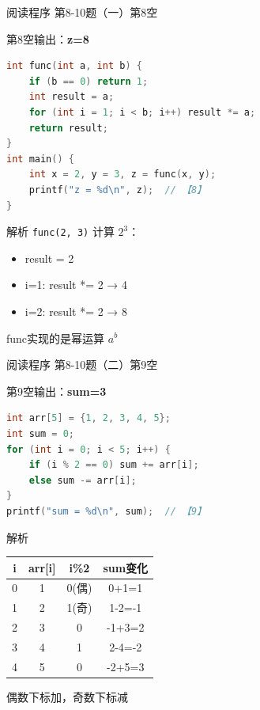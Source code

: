 \begin{frame}[fragile]{阅读程序 第8-10题（一）}{第8空}
    \begin{exampleblock}{第8空输出：\textbf{z=8}}
    \end{exampleblock}
    \begin{lstlisting}[language=C]
int func(int a, int b) {
    if (b == 0) return 1;
    int result = a;
    for (int i = 1; i < b; i++) result *= a;
    return result;
}
int main() {
    int x = 2, y = 3, z = func(x, y);
    printf("z = %d\n", z);  // 【8】
}
\end{lstlisting}
    \pause
    \begin{alertblock}{解析}
        \footnotesize \texttt{func(2, 3)} 计算 $2^3$：
        \begin{itemize}
            \setlength{\itemsep}{0pt}
            \item result = 2
            \item i=1: result *= 2 → 4
            \item i=2: result *= 2 → 8
        \end{itemize}
        func实现的是幂运算 $a^b$
    \end{alertblock}
\end{frame}

\begin{frame}[fragile]{阅读程序 第8-10题（二）}{第9空}
    \begin{exampleblock}{第9空输出：\textbf{sum=3}}
    \end{exampleblock}
    \begin{lstlisting}[language=C]
int arr[5] = {1, 2, 3, 4, 5};
int sum = 0;
for (int i = 0; i < 5; i++) {
    if (i % 2 == 0) sum += arr[i];
    else sum -= arr[i];
}
printf("sum = %d\n", sum);  // 【9】
\end{lstlisting}
    \pause
    \begin{alertblock}{解析}
        \small
        \begin{tabular}{c|c|c|c}
            i & arr[i] & i\%2 & sum变化 \\ \hline
            0 & 1 & 0(偶) & 0+1=1 \\
            1 & 2 & 1(奇) & 1-2=-1 \\
            2 & 3 & 0 & -1+3=2 \\
            3 & 4 & 1 & 2-4=-2 \\
            4 & 5 & 0 & -2+5=3
        \end{tabular}

        偶数下标加，奇数下标减
    \end{alertblock}
\end{frame}

